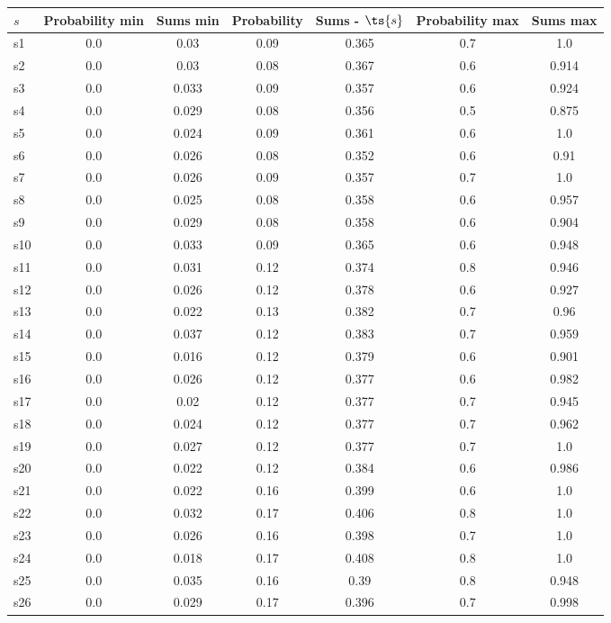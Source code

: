 \documentclass{article}
\begin{document}
\noindent\begin{tabular}{|l|c|c|c|c|c|c|}
\hline
$s$& Probability min & Sums min & Probability & Sums - $\ts{s}$ & Probability max & Sums max\\
\hline
s1 &0.0 & 0.03 & 0.09 & 0.365 & 0.7 & 1.0\\
\hline
s2 &0.0 & 0.03 & 0.08 & 0.367 & 0.6 & 0.914\\
\hline
s3 &0.0 & 0.033 & 0.09 & 0.357 & 0.6 & 0.924\\
\hline
s4 &0.0 & 0.029 & 0.08 & 0.356 & 0.5 & 0.875\\
\hline
s5 &0.0 & 0.024 & 0.09 & 0.361 & 0.6 & 1.0\\
\hline
s6 &0.0 & 0.026 & 0.08 & 0.352 & 0.6 & 0.91\\
\hline
s7 &0.0 & 0.026 & 0.09 & 0.357 & 0.7 & 1.0\\
\hline
s8 &0.0 & 0.025 & 0.08 & 0.358 & 0.6 & 0.957\\
\hline
s9 &0.0 & 0.029 & 0.08 & 0.358 & 0.6 & 0.904\\
\hline
s10 &0.0 & 0.033 & 0.09 & 0.365 & 0.6 & 0.948\\
\hline
s11 &0.0 & 0.031 & 0.12 & 0.374 & 0.8 & 0.946\\
\hline
s12 &0.0 & 0.026 & 0.12 & 0.378 & 0.6 & 0.927\\
\hline
s13 &0.0 & 0.022 & 0.13 & 0.382 & 0.7 & 0.96\\
\hline
s14 &0.0 & 0.037 & 0.12 & 0.383 & 0.7 & 0.959\\
\hline
s15 &0.0 & 0.016 & 0.12 & 0.379 & 0.6 & 0.901\\
\hline
s16 &0.0 & 0.026 & 0.12 & 0.377 & 0.6 & 0.982\\
\hline
s17 &0.0 & 0.02 & 0.12 & 0.377 & 0.7 & 0.945\\
\hline
s18 &0.0 & 0.024 & 0.12 & 0.377 & 0.7 & 0.962\\
\hline
s19 &0.0 & 0.027 & 0.12 & 0.377 & 0.7 & 1.0\\
\hline
s20 &0.0 & 0.022 & 0.12 & 0.384 & 0.6 & 0.986\\
\hline
s21 &0.0 & 0.022 & 0.16 & 0.399 & 0.6 & 1.0\\
\hline
s22 &0.0 & 0.032 & 0.17 & 0.406 & 0.8 & 1.0\\
\hline
s23 &0.0 & 0.026 & 0.16 & 0.398 & 0.7 & 1.0\\
\hline
s24 &0.0 & 0.018 & 0.17 & 0.408 & 0.8 & 1.0\\
\hline
s25 &0.0 & 0.035 & 0.16 & 0.39 & 0.8 & 0.948\\
\hline
s26 &0.0 & 0.029 & 0.17 & 0.396 & 0.7 & 0.998\\

\end{tabular}
\end{document}

